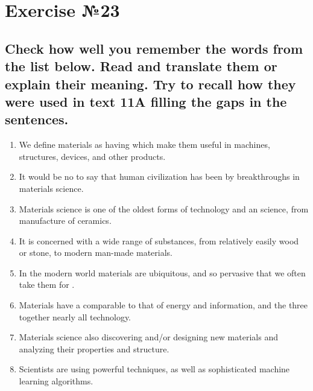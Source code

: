 \section{Exercise №23}

\subsection*{Check how well you remember the words from the list below. Read and translate them or explain their meaning. Try to recall how they were used in text 11A filling the gaps in the sentences.}
\begin{enumerate}
      \item We define materials as \underline{\hspace{2cm}} having \underline{\hspace{2cm}} which make them useful in machines, structures, devices, and other products.
      \item It would be no \underline{\hspace{2cm}} to say that human civilization has been \underline{\hspace{2cm}} by breakthroughs in materials science.
      \item Materials science is one of the oldest forms of technology and an \underline{\hspace{2cm}} science, \underline{\hspace{2cm}} from manufacture of ceramics.
      \item It is concerned with a wide range of substances, from relatively easily \underline{\hspace{2cm}} wood or stone, to modern man-made materials.
      \item In the modern world materials are ubiquitous, and so pervasive that we often take them for \underline{\hspace{2cm}}.
      \item Materials have a \underline{\hspace{2cm}} comparable to that of energy and information, and the three together \underline{\hspace{2cm}} nearly all technology.
      \item Materials science also \underline{\hspace{2cm}} discovering and/or designing new materials and analyzing their properties and structure.
      \item Scientists are using powerful \underline{\hspace{2cm}} techniques, as well as sophisticated machine learning algorithms.

\end{enumerate}
